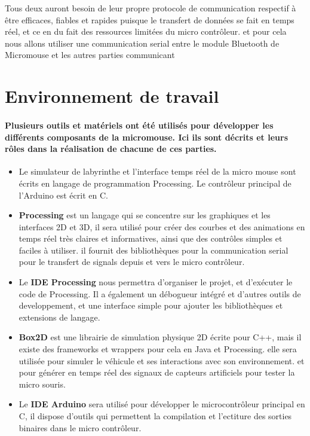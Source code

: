 Tous deux auront besoin de leur propre protocole de communication respectif
à être efficaces, fiables et rapides puisque le transfert de données se fait en
temps réel, et ce en du fait des ressources limitées du micro contrôleur. et
pour cela nous allons utiliser une communication serial entre le module
Bluetooth de Micromouse et les autres parties communicant


\section{Environnement de travail} \label{sec:environnement}

\paragraph{ 
   Plusieurs outils et matériels ont été utilisés pour développer les
différents composants de la micromouse. Ici ils sont décrits et leurs rôles
dans la réalisation de chacune de ces parties.}

\vspace{5mm}
\begin{itemize}
 
   \item Le simulateur de labyrinthe et l'interface temps réel de la micro mouse sont
écrits en langage de programmation Processing. Le contrôleur principal de
l'Arduino est écrit en C. \\

   \item \textbf{Processing} est un langage qui se concentre sur les graphiques et
les interfaces 2D et 3D, il sera utilisé pour créer des courbes et des
animations en temps réel très claires et informatives, ainsi que des
contrôles simples et faciles à utiliser. il fournit des bibliothèques pour
la communication serial pour le transfert de signals depuis et vers le micro
contrôleur. \\

 
   \item Le \textbf{IDE Processing} nous permettra d'organiser le projet, et
d'exécuter le code de Processing.  Il a également un débogueur intégré et
d'autres outils de developpement, et une interface simple pour ajouter les
bibliothèques et extensions de langage. \\

 
   \item \textbf{Box2D} est une librairie de simulation physique 2D écrite pour C++,
mais il existe des frameworks et wrappers pour cela en Java et Processing.
elle sera utilisée pour simuler le véhicule et ses interactions avec son
environnement. et pour générer en temps réel des signaux de capteurs
artificiels pour tester la micro souris. \\


   \item Le \textbf{IDE Arduino} sera utilisé pour développer le microcontrôleur
principal en C, il dispose d'outils qui permettent la compilation et
l'ectiture des sorties binaires dans le micro contrôleur. \\
\end{itemize}
